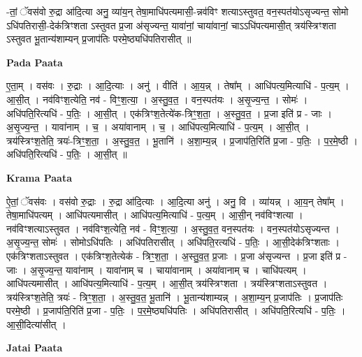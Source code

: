 \documentclass[17pt]{extarticle}
\begin{document}
-तां॒ ॅवस॑वो रु॒द्रा आ॑दि॒त्या अनु॒ व्या॑य॒न् तेषा॒माधि॑पत्यमासी॒-न्नव॑विꣳ शत्याऽस्तुवत॒ वन॒स्पत॑योऽसृज्यन्त॒ सोमो ऽधि॑पतिरासी॒-देक॑त्रिꣳशता ऽस्तुवत प्र॒जा अ॑सृज्यन्त॒ यावा॑नां॒ चाया॑वानां॒ चाऽऽधि॑पत्यमासी॒त् त्रय॑स्त्रिꣳशता ऽस्तुवत भू॒तान्य॑शाम्यन् प्र॒जाप॑तिः परमे॒ष्ठ्यधि॑पतिरासीत् ॥ \newline

\textbf{Pada Paata} \newline

ए॒ता॒म् । वस॑वः । रु॒द्राः । आ॒दि॒त्याः । अनु॑ । वीति॑ । आ॒य॒न्न् । तेषा᳚म् । आधि॑पत्य॒मित्याधि॑ - प॒त्य॒म् । आ॒सी॒त् । नव॑विꣳश॒त्येति॒ नव॑ - विꣳ॒॒श॒त्या॒ । अ॒स्तु॒व॒त॒ । वन॒स्पत॑यः । अ॒सृ॒ज्य॒न्त॒ । सोमः॑ । अधि॑पति॒रित्यधि॑ - प॒तिः॒ । आ॒सी॒त् । एक॑त्रिꣳश॒तेत्ये॑क-त्रिꣳ॒॒श॒ता॒ । अ॒स्तु॒व॒त॒ । प्र॒जा इति॑ प्र - जाः । अ॒सृ॒ज्य॒न्त॒ । यावा॑नाम् । च॒ । अया॑वानाम् । च॒ । आधि॑पत्य॒मित्याधि॑ - प॒त्य॒म् । आ॒सी॒त् । त्रय॑स्त्रिꣳश॒तेति॒ त्रयः॑-त्रिꣳ॒॒श॒ता॒ । अ॒स्तु॒व॒त॒ । भू॒तानि॑ । अ॒शा॒म्य॒न्न् । प्र॒जाप॑ति॒रिति॑ प्र॒जा - प॒तिः॒ । प॒र॒मे॒ष्ठी । अधि॑पति॒रित्यधि॑ - प॒तिः॒ । आ॒सी॒त् ॥  \newline


\textbf{Krama Paata} \newline

ऐ॒तां॒ ॅवस॑वः । वस॑वो रु॒द्राः । रु॒द्रा आ॑दि॒त्याः । आ॒दि॒त्या अनु॑ । अनु॒ वि । व्या॑यन्न् । आ॒य॒न् तेषा᳚म् । तेषा॒माधि॑पत्यम् । आधि॑पत्यमासीत् । आधि॑पत्य॒मित्याधि॑ - प॒त्य॒म् । आ॒सी॒न् नव॑विꣳशत्या । नव॑विꣳशत्याऽस्तुवत । नव॑विꣳश॒त्येति॒ नव॑ - विꣳ॒॒श॒त्या॒ । अ॒स्तु॒व॒त॒ वन॒स्पत॑यः । वन॒स्पत॑योऽसृज्यन्त । अ॒सृ॒ज्य॒न्त॒ सोमः॑ । सोमोऽधि॑पतिः । अधि॑पतिरासीत् । अधि॑पति॒रत्यधि॑ - प॒तिः॒ । आ॒सी॒देक॑त्रिꣳशताः । एक॑त्रिꣳशताऽस्तुवत । एक॑त्रिꣳश॒तेत्येक॑ - त्रिꣳ॒॒श॒ता॒ । अ॒स्तु॒व॒त॒ प्र॒जाः । प्र॒जा अ॑सृज्यन्त । प्र॒जा इति॑ प्र - जाः । अ॒सृ॒ज्य॒न्त॒ यावा॑नाम् । यावा॑नाम् च । चाया॑वानाम् । 
अया॑वानाम् च । चाधि॑पत्यम् । आधि॑पत्यमासीत् । आधि॑पत्य॒मित्याधि॑ - प॒त्य॒म् । आ॒सी॒त् त्रय॑स्त्रिꣳशता । त्रय॑स्त्रिꣳशताऽस्तुवत । त्रय॑स्त्रिꣳश॒तेति॒ त्रयः॑ - त्रिꣳ॒॒श॒ता॒ । अ॒स्तु॒व॒त॒ भू॒तानि॑ । भू॒तान्य॑शाम्यन्न् । अ॒शा॒म्य॒न् प्र॒जाप॑तिः । प्र॒जाप॑तिः 
परमे॒ष्ठी । प्र॒जाप॑ति॒रिति॑ प्र॒जा - प॒तिः॒ । 
प॒र॒मे॒ष्ठ्यधि॑पतिः । अधि॑पतिरासीत् । अधि॑पति॒रित्यधि॑ - प॒तिः॒ । आ॒सी॒दित्या॑सीत् । \newline

\textbf{Jatai Paata} \newline
\end{document}
